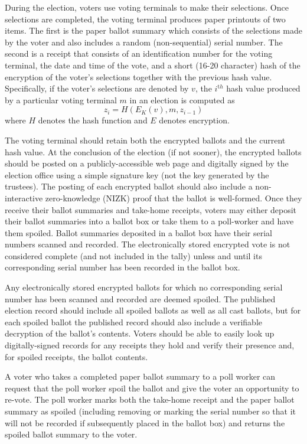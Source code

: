 During the election, voters use voting terminals to make their
selections.  Once selections are completed, the voting terminal
produces paper printouts of two items.  The first is the paper ballot summary
which consists of the selections made by the voter and also includes a
random (non-sequential) serial number.  The second is a receipt that
consists of an identification number for the voting terminal,
the date and time of the vote, and a short (16-20 character) hash of the encryption of
the voter's selections together with the previous hash value.
Specifically, if the voter's selections are denoted by $v$, the
$i^{{\mathrm th}}$ hash value produced by a particular voting terminal $m$ in an election is computed as
\[
z_i=H(E_K(v),m,z_{i-1} )
\]
\noindent
where $H$ denotes the hash function and $E$ denotes encryption.

The voting terminal should retain both the encrypted ballots and the current hash value.  At the conclusion of the election (if not sooner), the encrypted ballots should be posted on a publicly-accessible web page and digitally signed by the election office using a simple signature key (not the key generated by the trustees).  The posting of each encrypted ballot should also include a non-interactive zero-knowledge (NIZK) proof that the ballot is well-formed.
Once they receive their ballot summaries and take-home receipts, voters may either deposit their ballot summaries into a ballot box or take them to a poll-worker and have them spoiled.  Ballot summaries deposited in a ballot box have their serial numbers scanned and recorded.  The electronically stored encrypted vote is not considered complete (and not included in the tally) unless and until its corresponding serial number has been recorded in the ballot box.

Any electronically stored encrypted ballots for which no corresponding serial number has been scanned and recorded are deemed spoiled.  The published election record should include all spoiled ballots as well as all cast ballots, but for each spoiled ballot the published record should also include a verifiable decryption of the ballot's contents.  Voters should be able to easily look up digitally-signed records for any receipts they hold and verify their presence and, for spoiled receipts, the ballot contents.

A voter who takes a completed paper ballot summary to a poll worker can request that the poll worker spoil the ballot and give the voter an opportunity to re-vote.  
The poll worker marks both the take-home receipt and the paper ballot summary as spoiled (including removing or marking the serial number so that it will not be recorded if subsequently placed in the ballot box) and returns the spoiled ballot summary to the voter.

